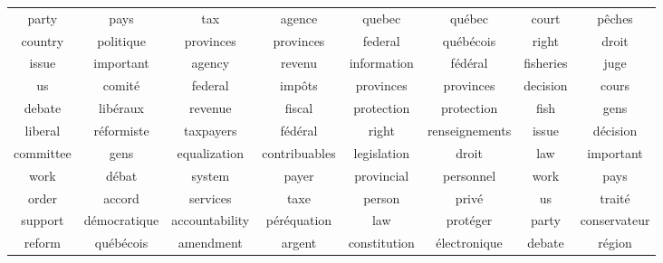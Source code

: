\documentclass{article}
\begin{document}
\begin{table*}[h!] 
\centering 
\begin{tabular}{cc|cc|cc|cc} 
                party &                 pays &                   tax &               agence &                quebec &              qu\'ebec &                 court &              p\^eches  \\ 
               country &            politique &             provinces &            provinces &               federal &          qu\'eb\'ecois &                 right &                droit  \\ 
                 issue &            important &                agency &               revenu &           information &            f\'ed\'eral &             fisheries &                 juge  \\ 
                    us &              comit\'e &               federal &              imp\^ots &             provinces &            provinces &              decision &                cours  \\ 
                debate &            lib\'eraux &               revenue &               fiscal &            protection &           protection &                  fish &                 gens  \\ 
               liberal &          r\'eformiste &             taxpayers &            f\'ed\'eral &                 right &       renseignements &                 issue &            d\'ecision  \\ 
             committee &                 gens &          equalization &        contribuables &           legislation &                droit &                   law &            important  \\ 
                  work &               d\'ebat &                system &                payer &            provincial &            personnel &                  work &                 pays  \\ 
                 order &               accord &              services &                 taxe &                person &               priv\'e &                    us &              trait\'e  \\ 
               support &        d\'emocratique &        accountability &        p\'er\'equation &                   law &            prot\'eger &                 party &         conservateur  \\ 
                reform &          qu\'eb\'ecois &             amendment &               argent &          constitution &        \'electronique &                debate &              r\'egion  \\ 

\end{tabular}
\end{table*}
\end{document}
